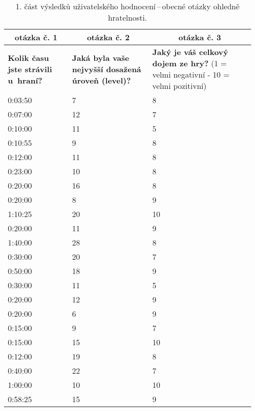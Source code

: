 \begin{table}[htbp]
\centering
\begin{tabularx}{\textwidth}{|X|X|X|}
\hline
\multicolumn{1}{|c|}{\textbf{otázka č. 1}} & \multicolumn{1}{c|}{\textbf{otázka č. 2}} & \multicolumn{1}{c|}{\textbf{otázka č. 3}} \\ \hline
\textbf{Kolik času jste strávili u~hraní?} & \textbf{Jaká byla vaše nejvyšší dosažená úroveň (level)?} & \textbf{Jaký je váš celkový dojem ze hry?} (1 = velmi negativní - 10 = velmi pozitivní) \\ \hline
0:03:50 & 7 & 8 \\ \hline
0:07:00 & 12 & 7 \\ \hline
0:10:00 & 11 & 5 \\ \hline
0:10:55 & 9 & 8 \\ \hline
0:12:00 & 11 & 8 \\ \hline
0:23:00 & 10 & 8 \\ \hline
0:20:00 & 16 & 8 \\ \hline
0:20:00 & 8 & 9 \\ \hline
1:10:25 & 20 & 10 \\ \hline
0:20:00 & 11 & 9 \\ \hline
1:40:00 & 28 & 8 \\ \hline
0:30:00 & 20 & 7 \\ \hline
0:50:00 & 18 & 9 \\ \hline
0:30:00 & 11 & 5 \\ \hline
0:20:00 & 12 & 9 \\ \hline
0:20:00 & 6 & 9 \\ \hline
0:15:00 & 9 & 7 \\ \hline
0:15:00 & 15 & 10 \\ \hline
0:12:00 & 19 & 8 \\ \hline
0:40:00 & 22 & 7 \\ \hline
1:00:00 & 10 & 10 \\ \hline
0:58:25 & 15 & 9 \\ \hline
\end{tabularx}
\caption{1. část výsledků uživatelského hodnocení\,--\,obecné otázky ohledně hratelnosti.}
\end{table}

